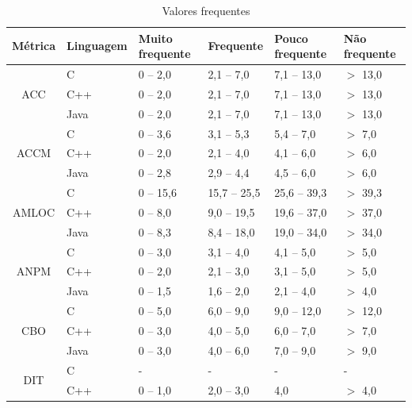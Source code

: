 \begin{table}[H]
  \caption{Valores frequentes\cite{Meirelles2013}}
  \centering
  \begin{tabular}{| c | l | l | l | l | l |}
    \hline
    Métrica           & Linguagem & Muito frequente & Frequente & Pouco frequente & Não frequente \\
    \hline
\multirow{3}{*}{ACC}   & C         & 0 -- 2,0   & 2,1 -- 7,0   & 7,1 -- 13,0  & $>$ 13,0  \\
                       & C++       & 0 -- 2,0   & 2,1 -- 7,0   & 7,1 -- 13,0  & $>$ 13,0  \\
                       & Java      & 0 -- 2,0   & 2,1 -- 7,0   & 7,1 -- 13,0  & $>$ 13,0  \\
    \hline
\multirow{3}{*}{ACCM}  & C         & 0 -- 3,6   & 3,1 -- 5,3   & 5,4 -- 7,0   & $>$ 7,0   \\
                       & C++       & 0 -- 2,0   & 2,1 -- 4,0   & 4,1 -- 6,0   & $>$ 6,0   \\
                       & Java      & 0 -- 2,8   & 2,9 -- 4,4   & 4,5 -- 6,0   & $>$ 6,0   \\
    \hline
\multirow{3}{*}{AMLOC} & C         & 0 -- 15,6  & 15,7 -- 25,5 & 25,6 -- 39,3 & $>$ 39,3  \\
                       & C++       & 0 -- 8,0   & 9,0 -- 19,5  & 19,6 -- 37,0 & $>$ 37,0  \\
                       & Java      & 0 -- 8,3   & 8,4 -- 18,0  & 19,0 -- 34,0 & $>$ 34,0  \\
    \hline
\multirow{3}{*}{ANPM}  & C         & 0 -- 3,0   & 3,1 -- 4,0   & 4,1 -- 5,0   & $>$ 5,0   \\
                       & C++       & 0 -- 2,0   & 2,1 -- 3,0   & 3,1 -- 5,0   & $>$ 5,0   \\
                       & Java      & 0 -- 1,5   & 1,6 -- 2,0   & 2,1 -- 4,0   & $>$ 4,0   \\
    \hline
\multirow{3}{*}{CBO}   & C         & 0 -- 5,0   & 6,0 -- 9,0   & 9,0 -- 12,0  & $>$ 12,0  \\
                       & C++       & 0 -- 3,0   & 4,0 -- 5,0   & 6,0 -- 7,0   & $>$ 7,0   \\
                       & Java      & 0 -- 3,0   & 4,0 -- 6,0   & 7,0 -- 9,0   & $>$ 9,0   \\
    \hline
\multirow{3}{*}{DIT}   & C         & -          & -            & -            & -         \\
                       & C++       & 0 -- 1,0   & 2,0 -- 3,0   & 4,0          & $>$ 4,0   \\

\end{tabular}
\end{table}
